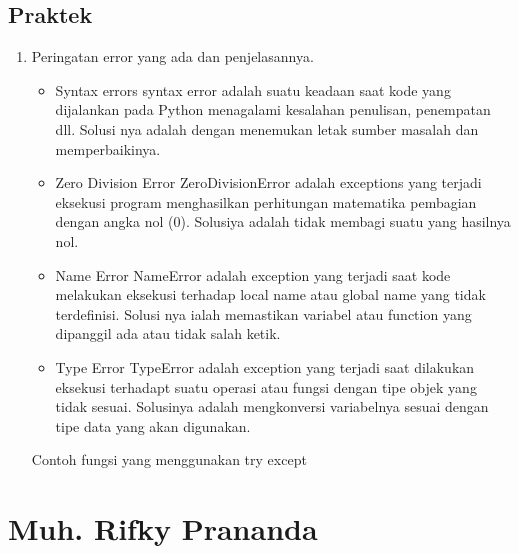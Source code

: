 \subsection{Praktek}
\begin{enumerate}
    \item Peringatan error yang ada dan penjelasannya.

    \begin{itemize}
    	\item Syntax errors
    	syntax error adalah suatu keadaan saat kode yang dijalankan pada Python menagalami kesalahan penulisan, penempatan dll.
    	Solusi nya adalah dengan menemukan letak sumber masalah dan memperbaikinya.
    	
    	\item Zero Division Error
    	ZeroDivisionError adalah exceptions yang terjadi eksekusi program menghasilkan perhitungan matematika pembagian dengan angka nol (0). Solusiya adalah tidak membagi suatu yang hasilnya nol.
    	\item Name Error
    	NameError adalah exception yang terjadi saat kode melakukan eksekusi terhadap local name atau global name yang tidak terdefinisi. Solusi nya ialah memastikan variabel atau function yang dipanggil ada atau tidak salah ketik.
    	\item Type Error
    	TypeError adalah exception yang terjadi saat dilakukan eksekusi terhadapt suatu operasi atau fungsi dengan tipe objek yang tidak sesuai. Solusinya adalah mengkonversi variabelnya sesuai dengan tipe data yang akan digunakan.
    \end{itemize}

    Contoh fungsi yang menggunakan try except
 

\end{enumerate}
\section{Muh. Rifky Prananda}
